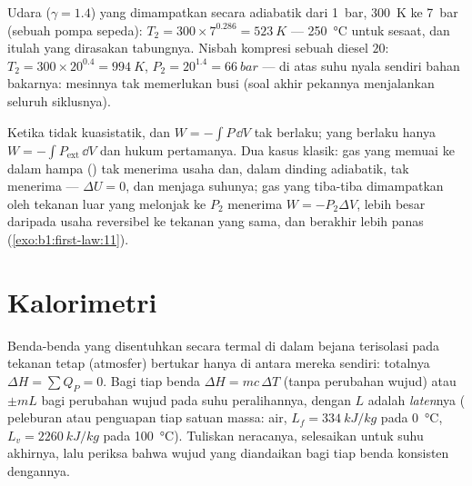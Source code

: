 \begin{example}\label{ex:b1:first-law:diesel}
Udara ($\gamma = 1.4$) yang dimampatkan secara adiabatik dari \qty{1}{bar}, \qty{300}{K}
ke \qty{7}{bar} (sebuah pompa sepeda): $T_2 = 300 \times 7^{0.286} = \qty{523}{K}$
--- \qty{250}{\degreeCelsius} untuk sesaat, dan itulah yang dirasakan tabungnya. Nisbah
kompresi sebuah diesel $20$: $T_2 = 300 \times 20^{0.4} = \qty{994}{K}$,
$P_2 = 20^{1.4} = \qty{66}{bar}$ --- di atas suhu nyala sendiri
bahan bakarnya: mesinnya tak memerlukan busi (soal akhir pekannya menjalankan
seluruh siklusnya).
\end{example}

\begin{remark}\label{rem:b1:first-law:irreversible}
Ketika  tidak kuasistatik,  dan $W =
-\int P\,\dd V$ tak berlaku; yang berlaku hanya $W = -\int P_{\mathrm{ext}}\,\dd V$ dan
hukum pertamanya. Dua kasus klasik: gas yang memuai ke dalam hampa () tak menerima usaha dan, dalam dinding adiabatik, tak menerima  --- $\Delta U
= 0$, dan  menjaga suhunya; gas yang tiba-tiba dimampatkan
oleh tekanan luar yang melonjak ke $P_2$ menerima $W = -P_2\Delta V$, lebih besar
daripada usaha reversibel ke tekanan yang sama, dan berakhir lebih panas
(\cref{exo:b1:first-law:11}).
\end{remark}

\section{Kalorimetri}

\begin{method}\label{met:b1:first-law:calorimetry}
Benda-benda yang disentuhkan secara termal di dalam bejana terisolasi pada tekanan
tetap (atmosfer) bertukar  hanya di antara mereka sendiri: totalnya
$\Delta H = \sum Q_P = 0$. Bagi tiap benda $\Delta H = mc\,\Delta T$ (tanpa perubahan
wujud) atau $\pm mL$ bagi perubahan wujud pada suhu peralihannya,
dengan $L$ adalah \emph{ laten}nya ( peleburan atau penguapan tiap
satuan massa: air, $L_f = \qty{334}{kJ/kg}$ pada \qty{0}{\degreeCelsius}, $L_v =
\qty{2260}{kJ/kg}$ pada \qty{100}{\degreeCelsius}). Tuliskan neracanya, selesaikan
untuk suhu akhirnya, lalu periksa bahwa wujud yang diandaikan bagi tiap benda
konsisten dengannya.
\end{method}

